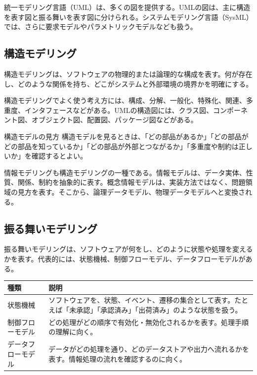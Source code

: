 \documentclass[a4paper,11pt]{ltjsarticle}
\begin{document}
統一モデリング言語（UML）は、多くの図を提供する。UMLの図は、主に構造を表す図と振る舞いを表す図に分けられる。システムモデリング言語（SysML）では、さらに要求モデルやパラメトリックモデルなども扱う。

\subsection{構造モデリング}
構造モデリングは、ソフトウェアの物理的または論理的な構成を表す。何が存在し、どのような関係を持ち、どこがシステムと外部環境の境界かを明確にする。

構造モデリングでよく使う考え方には、構成、分解、一般化、特殊化、関連、多重度、インタフェースなどがある。UMLの構造図には、クラス図、コンポーネント図、オブジェクト図、配置図、パッケージ図などがある。

\begin{pointbox}{構造モデルの見方}
構造モデルを見るときは、「どの部品があるか」「どの部品がどの部品を知っているか」「どの部品が外部とつながるか」「多重度や制約は正しいか」を確認するとよい。
\end{pointbox}

情報モデリングも構造モデリングの一種である。情報モデルは、データ実体、性質、関係、制約を抽象的に表す。概念情報モデルは、実装方法ではなく、問題領域の見方を表す。そこから、論理データモデル、物理データモデルへと変換される。

\subsection{振る舞いモデリング}
振る舞いモデリングは、ソフトウェアが何をし、どのように状態や処理を変えるかを表す。代表的には、状態機械、制御フローモデル、データフローモデルがある。

\begin{longtable}{>{\raggedright\arraybackslash}p{}>{\raggedright\arraybackslash}p{}}
\toprule
\textbf{種類} & \textbf{説明} \\
\midrule
状態機械 & ソフトウェアを、状態、イベント、遷移の集合として表す。たとえば「未承認」「承認済み」「出荷済み」のような状態を扱う。\\
制御フローモデル & どの処理がどの順序で有効化・無効化されるかを表す。処理手順の理解に向く。\\
データフローモデル & データがどの処理を通り、どのデータストアや出力へ流れるかを表す。情報処理の流れを確認するのに向く。\\
\bottomrule
\end{longtable}
\end{document}
